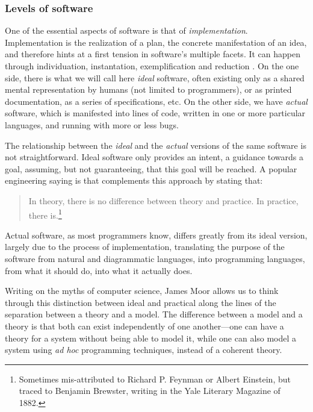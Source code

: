 \subsubsection{Levels of software}
\label{subsubsec:levels-software}

One of the essential aspects of software is that of \emph{implementation}. Implementation is the realization of a plan, the concrete manifestation of an idea, and therefore hints at a first tension in software's multiple facets. It can happen through individuation, instantation, exemplification and reduction \citep{rapaport_philosophy_2005}. On the one side, there is what we will call here \emph{ideal} software, often existing only as a shared mental representation by humans (not limited to programmers), or as printed documentation, as a series of specifications, etc. On the other side, we have \emph{actual} software, which is manifested into lines of code, written in one or more particular languages, and running with more or less bugs.

The relationship between the \emph{ideal} and the \emph{actual} versions of the same software is not straightforward. Ideal software only provides an intent, a guidance towards a goal, assuming, but not guaranteeing, that this goal will be reached. A popular engineering saying is that complements this approach by stating that:

\begin{quote}
    In theory, there is no difference between theory and practice. In practice, there is.\footnote{Sometimes mis-attributed to Richard P. Feynman or Albert Einstein, but traced to Benjamin Brewster, writing in the Yale Literary Magazine of 1882.}
\end{quote}

Actual software, as most programmers know, differs greatly from its ideal version, largely due to the process of implementation, translating the purpose of the software from natural and diagrammatic languages, into programming languages, from what it should do, into what it actually does.

Writing on the myths of computer science, James Moor \citep{moor_three_1978} allows us to think through this distinction between ideal and practical along the lines of the separation between a theory and a model. The difference between a model and a theory is that both can exist independently of one another—one can have a theory for a system without being able to model it, while one can also model a system using \emph{ad hoc} programming techniques, instead of a coherent theory.

